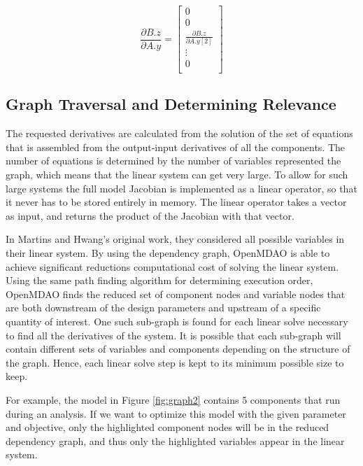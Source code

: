 \documentclass[]{aiaa-tc} %
\begin{document}
        \begin{equation} 
            \frac{\partial B.z}{\partial A.y} = 
            \begin{bmatrix} 
                0 \\
                0 \\ 
                \frac{\partial B.z}{\partial A.y[2]} \\
                \vdots \\
                0 \\
            \end{bmatrix}
        \end{equation} 

    \subsection{Graph Traversal and Determining Relevance}

    
        The requested derivatives are calculated from the solution of the set of equations that is assembled
        from the output-input derivatives of all the components. The number of equations
        is determined by the number of variables represented the graph, which means that the linear
        system can get very large. To allow for such large systems the full model Jacobian is implemented as
        a linear operator, so that it never has to be stored entirely in memory. The
        linear operator takes a vector as input, and returns the product of the Jacobian with that vector.

        In Martins and Hwang's original work, they considered all possible variables in their linear system.
        By using the dependency graph, OpenMDAO is able to achieve significant reductions computational cost of
        solving the linear system. Using the same path finding algorithm for determining execution order,
        OpenMDAO finds the reduced set of component nodes and variable nodes that are both downstream of the design parameters
        and upstream of a specific quantity of interest. One such sub-graph is found for each linear solve necessary to
        find all the derivatives of the system. It is possible that each sub-graph will contain different sets
        of variables and components depending on the structure of the graph. Hence, each linear solve step
        is kept to its minimum possible size to keep.

        For example, the model in Figure \ref{fig:graph2} contains 5 components that run during an analysis. If we
        want to optimize this model with the given parameter and objective, only the highlighted component nodes
        will be in the reduced dependency graph, and thus only the highlighted variables appear in the linear
        system.
\end{document}
